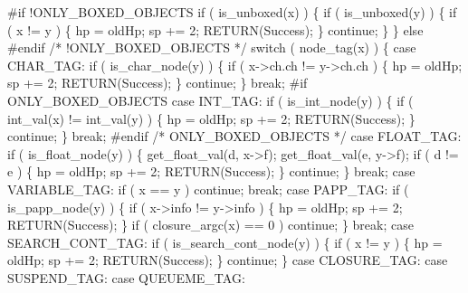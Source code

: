 #if !ONLY_BOXED_OBJECTS
        if ( is_unboxed(x) )
        \{
            if ( is_unboxed(y) )
            \{
                if ( x != y )
                \{
                    hp  = oldHp;
                    sp += 2;
                    RETURN(Success);
                \}
                continue;
            \}
        \}
        else
#endif /* !ONLY_BOXED_OBJECTS */
            switch ( node_tag(x) )
            \{
            case CHAR_TAG:
                if ( is_char_node(y) )
                \{
                    if ( x->ch.ch != y->ch.ch )
                    \{
                        hp  = oldHp;
                        sp += 2;
                        RETURN(Success);
                    \}
                    continue;
                \}
                break;
#if ONLY_BOXED_OBJECTS
            case INT_TAG:
                if ( is_int_node(y) )
                \{
                    if ( int_val(x) != int_val(y) )
                    \{
                        hp  = oldHp;
                        sp += 2;
                        RETURN(Success);
                    \}
                    continue;
                \}
                break;
#endif /* ONLY_BOXED_OBJECTS */
            case FLOAT_TAG:
                if ( is_float_node(y) )
                \{
                    get_float_val(d, x->f);
                    get_float_val(e, y->f);
                    if ( d != e )
                    \{
                        hp  = oldHp;
                        sp += 2;
                        RETURN(Success);
                    \}
                    continue;
                \}
                break;
            case VARIABLE_TAG:
                if ( x == y )
                    continue;
                break;
            case PAPP_TAG:
                if ( is_papp_node(y) )
                \{
                    if ( x->info != y->info )
                    \{
                        hp  = oldHp;
                        sp += 2;
                        RETURN(Success);
                    \}
                    if ( closure_argc(x) == 0 )
                        continue;
                \}
                break;
            case SEARCH_CONT_TAG:
                if ( is_search_cont_node(y) )
                \{
                    if ( x != y )
                    \{
                        hp  = oldHp;
                        sp += 2;
                        RETURN(Success);
                    \}
                    continue;
                \}
            case CLOSURE_TAG:
            case SUSPEND_TAG:
            case QUEUEME_TAG:
